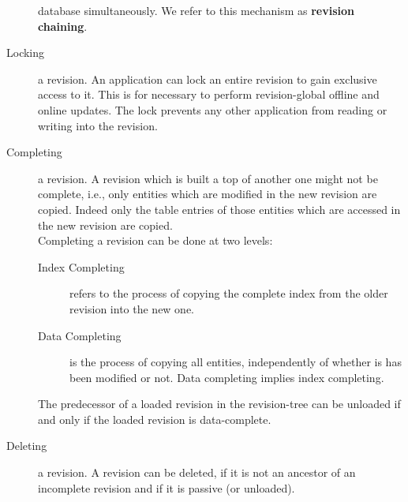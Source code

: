 \documentclass[a4paper, 10pt]{book}
\begin{document}
\begin{description}
                                        database simultaneously. We refer to this mechanism as
                                        \textbf{revision chaining}.
                                    \item[Locking] a revision. An application can lock an entire revision
                                        to gain exclusive access to it. This is for necessary to perform
                                        revision-global offline and online updates. The lock prevents any
                                        other application from reading or writing into the revision. 
                                    \item[Completing] a revision. A revision which is built a top of
                                        another one might not be complete, i.e., only entities which are
                                        modified in the new revision are copied. Indeed only the
                                        table entries of those entities which are accessed in the new
                                        revision are copied.\\
                                        Completing a revision can be done at two levels:
                                        \begin{description}
                                            \item[Index Completing] refers to the process of copying the
                                                complete index from the older revision into the new one.
                                            \item[Data Completing] is the process of copying all entities,
                                                independently of whether is has been modified or not. Data
                                                completing implies index completing. 
                                        \end{description}
                                        The predecessor of a loaded revision in the revision-tree can be
                                        unloaded if and only if the loaded revision is data-complete.
                                    \item[Deleting] a revision. A revision can be deleted, if it is not an
                                        ancestor of an incomplete revision and if it is passive (or
                                        unloaded).

\end{description}
\end{document}
